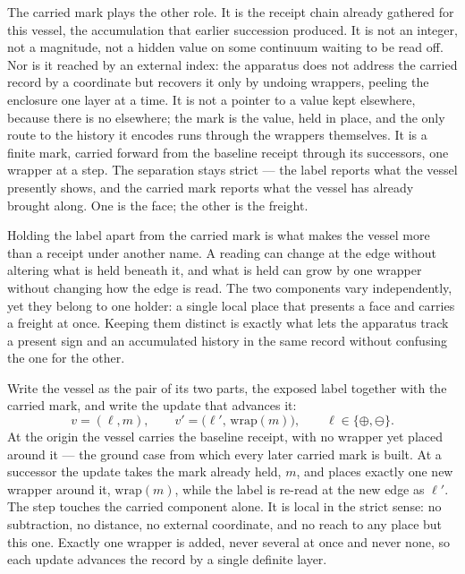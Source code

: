 The carried mark plays the other role. It is the receipt chain already gathered for this vessel, the accumulation that earlier succession produced. It is not an integer, not a magnitude, not a hidden value on some continuum waiting to be read off. Nor is it reached by an external index: the apparatus does not address the carried record by a coordinate but recovers it only by undoing wrappers, peeling the enclosure one layer at a time. It is not a pointer to a value kept elsewhere, because there is no elsewhere; the mark is the value, held in place, and the only route to the history it encodes runs through the wrappers themselves. It is a finite mark, carried forward from the baseline receipt through its successors, one wrapper at a step. The separation stays strict --- the label reports what the vessel presently shows, and the carried mark reports what the vessel has already brought along. One is the face; the other is the freight.

Holding the label apart from the carried mark is what makes the vessel more than a receipt under another name. A reading can change at the edge without altering what is held beneath it, and what is held can grow by one wrapper without changing how the edge is read. The two components vary independently, yet they belong to one holder: a single local place that presents a face and carries a freight at once. Keeping them distinct is exactly what lets the apparatus track a present sign and an accumulated history in the same record without confusing the one for the other.

Write the vessel as the pair of its two parts, the exposed label together with the carried mark, and write the update that advances it:
\[ v=(\ell,m), \qquad v'=\bigl(\ell',\,\mathrm{wrap}(m)\bigr), \qquad \ell\in\{\oplus,\ominus\}. \]
At the origin the vessel carries the baseline receipt, with no wrapper yet placed around it --- the ground case from which every later carried mark is built. At a successor the update takes the mark already held, $m$, and places exactly one new wrapper around it, $\mathrm{wrap}(m)$, while the label is re-read at the new edge as $\ell'$. The step touches the carried component alone. It is local in the strict sense: no subtraction, no distance, no external coordinate, and no reach to any place but this one. Exactly one wrapper is added, never several at once and never none, so each update advances the record by a single definite layer.

